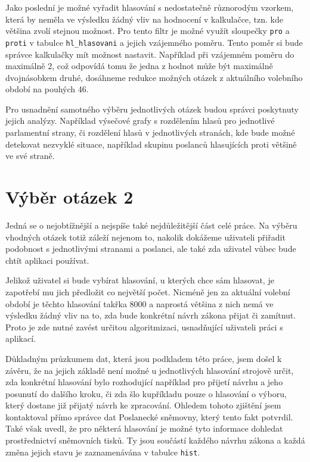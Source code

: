 \par Jako poslední je možné vyřadit hlasování s nedostatečně různorodým vzorkem, která by neměla ve výsledku žádný vliv na hodnocení v kalkulačce, tzn. kde většina zvolí stejnou možnost. Pro tento filtr je možné využít sloupečky \texttt{pro} a \texttt{proti} v tabulce \texttt{hl\_hlasovani} a jejich vzájemného poměru. Tento poměr si bude správce kalkulačky mít možnost nastavit. Například při vzájemném poměru do maximálně 2, což odpovídá tomu že jedna z hodnot může být maximálně dvojnásobkem druhé, dosáhneme redukce možných otázek z aktuálního volebního období na pouhých 46. \\ 

\par Pro usnadnění samotného výběru jednotlivých otázek budou správci poskytnuty jejich analýzy. Například výsečové grafy s rozdělením hlasů pro jednotlivé parlamentní strany, či rozdělení hlasů v jednotlivých stranách, kde bude možné detekovat nezvyklé situace, například skupinu poslanců hlasujících proti většině ve své straně.

\section{Výběr otázek 2}
Jedná se o nejobtížnější a nejspíše také nejdůležitější část celé práce. Na výběru vhodných otázek totiž záleží nejenom to, nakolik dokážeme uživateli přiřadit podobnost s jednotlivými stranami a poslanci, ale také zda uživatel vůbec bude chtít aplikaci používat.\\

\par Jelikož uživatel si bude vybírat hlasování, u kterých chce sám hlasovat, je zapotřebí mu jich předložit co největší počet. Nicméně jen za aktuální volební období je těchto hlasování takřka 8000 a naprostá většina z nich nemá ve výsledku žádný vliv na to, zda bude konkrétní návrh zákona přijat či zamítnut. Proto je zde nutné zavést určitou algoritmizaci, usnadňující uživateli práci s aplikací. \\

\par Důkladným průzkumem dat, která jsou podkladem této práce, jsem došel k závěru, že na jejich základě není možné u jednotlivých hlasování strojově určit, zda konkrétní hlasování bylo rozhodující například pro přijetí návrhu a jeho posunutí do dalšího kroku, či zda šlo kupříkladu pouze o hlasování o výboru, který dostane již přijatý návrh ke zpracování. Ohledem tohoto zjištění jsem kontaktoval přímo správce dat Poslanecké sněmovny, který tento fakt potvrdil. Také však uvedl, že pro některá hlasování je možné tyto informace dohledat prostřednictví sněmovních tisků. Ty jsou součástí každého návrhu zákona a každá změna jejich stavu je zaznamenávána v tabulce \texttt{hist}.\\

